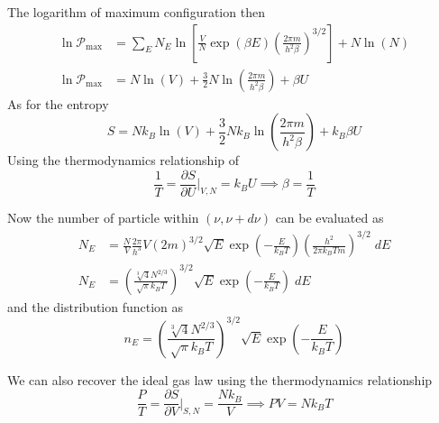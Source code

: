 \documentclass[../../../Main.tex]{subfiles}
\begin{document}
The logarithm of maximum configuration then 
\begin{align*}
    \ln \mathcal{P}_{\max}&=\sum_E N_E\ln\left[ \frac{V}{N}\exp\left(\beta E\right) \left(\frac{2\pi m}{h^2\beta}\right)^{3/2}\right]+N\ln (N)\\
    \ln \mathcal{P}_{\max}&=N\ln(V)+\frac{3}{2}N\ln\left(\frac{2\pi m}{h^2\beta}\right) +\beta U
\end{align*}
As for the entropy
\begin{equation*}
    S=Nk_B\ln(V)+\frac{3}{2}Nk_B\ln\left(\frac{2\pi m}{h^2\beta}\right) +k_B\beta U
\end{equation*}
Using the thermodynamics relationship of 
\begin{equation*}
    \frac{1}{T}=\frac{\partial S}{\partial U}\bigg|_{V,N}= k_B U \implies \beta=\frac{1}{T}
\end{equation*}

Now the number of particle within $(\nu,\nu+d\nu)$ can be evaluated as 
\begin{align*}
    N_E&=\frac{N}{V}\frac{2\pi}{h^3}V(2m)^{3/2}\sqrt{E} \exp\left(-\frac{E}{k_BT}\right) \left(\frac{h^2}{2\pi k_BT m}\right)^{3/2}\;dE\\
    N_E&=\left(\frac{\sqrt[3]{4} N^{2/3}}{\sqrt{\pi}k_B T}\right)^{3/2} \sqrt{E}\exp\left(-\frac{E}{k_BT}\right)\;dE
\end{align*}
and the distribution function as 
\begin{equation*}
    n_E=\left(\frac{\sqrt[3]{4} N^{2/3}}{\sqrt{\pi}k_B T}\right)^{3/2} \sqrt{E}\exp\left(-\frac{E}{k_BT}\right)
\end{equation*}

We can also recover the ideal gas law using the thermodynamics relationship
\begin{equation*}
    \frac{P}{T}=\frac{\partial S}{\partial V}\bigg|_{S,N}=\frac{Nk_B}{V} \implies PV=Nk_BT
\end{equation*}
\end{document}
